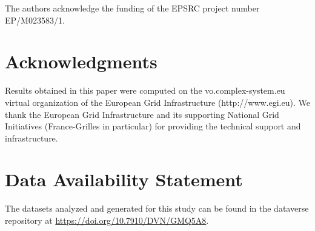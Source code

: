 \documentclass[utf8]{frontiersFPHY} %
\begin{document}
The authors acknowledge the funding of the EPSRC project number EP/M023583/1.

\section*{Acknowledgments}

Results obtained in this paper were computed on the vo.complex-system.eu virtual organization of the European Grid Infrastructure (http://www.egi.eu). We thank the European Grid Infrastructure and its supporting National Grid Initiatives (France-Grilles in particular) for providing the technical support and infrastructure.



\section*{Data Availability Statement}

The datasets analyzed and generated for this study can be found in the dataverse repository at \url{https://doi.org/10.7910/DVN/GMQ5A8}.


%





\end{document}
